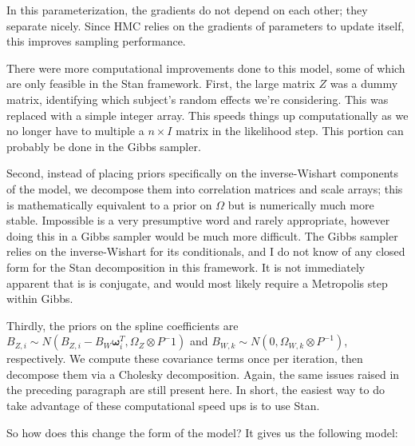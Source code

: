 In this parameterization, the gradients do not depend on each other; they separate nicely.  
Since HMC relies on the gradients of parameters to update itself, this improves sampling performance.

There were more computational improvements done to this model, some of which are only feasible in the Stan framework.  
First, the large matrix \(Z\) was a dummy matrix, identifying which subject's random effects we're considering.  
This was replaced with a simple integer array.  This speeds things up computationally as we no longer have to multiple a 
\(n\times I\) matrix in the likelihood step.  This portion can probably be done in the Gibbs sampler.  

Second, instead of placing priors specifically on the inverse-Wishart components of the model, we decompose them into 
correlation matrices and scale arrays; this is mathematically equivalent to a prior on \(\Omega\) but is numerically much more stable.  
Impossible is a very presumptive word and rarely appropriate, however doing this in a Gibbs sampler would be much more difficult.  
The Gibbs sampler relies on the inverse-Wishart for its conditionals, and I do not know of any closed form for the Stan decomposition 
in this framework.  It is not immediately apparent that is is conjugate, and would most likely require a Metropolis step within Gibbs.

Thirdly, the priors on the spline coefficients are\(B_{Z,i}\sim N\left(B_{Z,i}-B_W\boldsymbol{\omega}_i^T,\Omega_Z\otimes P^-1\right)\) 
and \(B_{W,k}\sim N\left(0,\Omega_{W,k}\otimes P^{-1}\right)\), respectively.  We compute these covariance terms once per iteration, 
then decompose them via a Cholesky decomposition.  Again, the same issues raised in the preceding paragraph are still present here.  
In short, the easiest way to do take advantage of these computational speed ups is to use Stan.  

So how does this change the form of the model?  It gives us the following model:

